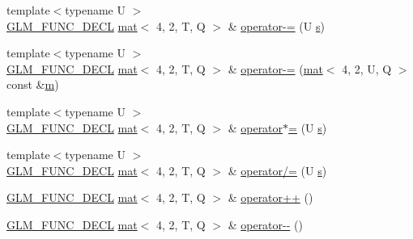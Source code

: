 \begin{DoxyCompactItemize}
\item 
{\footnotesize template$<$typename U $>$ }\\\hyperlink{setup_8hpp_ab2d052de21a70539923e9bcbf6e83a51}{G\+L\+M\+\_\+\+F\+U\+N\+C\+\_\+\+D\+E\+CL} \hyperlink{structglm_1_1mat}{mat}$<$ 4, 2, T, Q $>$ \& \hyperlink{structglm_1_1mat_3_014_00_012_00_01_t_00_01_q_01_4_a2154501995309db9c93fb4972f39f17c}{operator-\/=} (U \hyperlink{_s_d_l__opengl_8h_a4af680a6c683f88ed67b76f207f2e6e4}{s})
\item 
{\footnotesize template$<$typename U $>$ }\\\hyperlink{setup_8hpp_ab2d052de21a70539923e9bcbf6e83a51}{G\+L\+M\+\_\+\+F\+U\+N\+C\+\_\+\+D\+E\+CL} \hyperlink{structglm_1_1mat}{mat}$<$ 4, 2, T, Q $>$ \& \hyperlink{structglm_1_1mat_3_014_00_012_00_01_t_00_01_q_01_4_a965c05f65e92e3c87e4a1e36f80c1d82}{operator-\/=} (\hyperlink{structglm_1_1mat}{mat}$<$ 4, 2, U, Q $>$ const \&\hyperlink{_s_d_l__opengl__glext_8h_af593500c283bf1a787a6f947f503a5c2}{m})
\item 
{\footnotesize template$<$typename U $>$ }\\\hyperlink{setup_8hpp_ab2d052de21a70539923e9bcbf6e83a51}{G\+L\+M\+\_\+\+F\+U\+N\+C\+\_\+\+D\+E\+CL} \hyperlink{structglm_1_1mat}{mat}$<$ 4, 2, T, Q $>$ \& \hyperlink{structglm_1_1mat_3_014_00_012_00_01_t_00_01_q_01_4_a4e8ca47ff05d03dd3ed84685dc401376}{operator$\ast$=} (U \hyperlink{_s_d_l__opengl_8h_a4af680a6c683f88ed67b76f207f2e6e4}{s})
\item 
{\footnotesize template$<$typename U $>$ }\\\hyperlink{setup_8hpp_ab2d052de21a70539923e9bcbf6e83a51}{G\+L\+M\+\_\+\+F\+U\+N\+C\+\_\+\+D\+E\+CL} \hyperlink{structglm_1_1mat}{mat}$<$ 4, 2, T, Q $>$ \& \hyperlink{structglm_1_1mat_3_014_00_012_00_01_t_00_01_q_01_4_aa1a9ec4ecebe060e0d61b07cbde4c234}{operator/=} (U \hyperlink{_s_d_l__opengl_8h_a4af680a6c683f88ed67b76f207f2e6e4}{s})
\item 
\hyperlink{setup_8hpp_ab2d052de21a70539923e9bcbf6e83a51}{G\+L\+M\+\_\+\+F\+U\+N\+C\+\_\+\+D\+E\+CL} \hyperlink{structglm_1_1mat}{mat}$<$ 4, 2, T, Q $>$ \& \hyperlink{structglm_1_1mat_3_014_00_012_00_01_t_00_01_q_01_4_a973f220e1471a6dd869ce2b5eb569bfa}{operator++} ()
\item 
\hyperlink{setup_8hpp_ab2d052de21a70539923e9bcbf6e83a51}{G\+L\+M\+\_\+\+F\+U\+N\+C\+\_\+\+D\+E\+CL} \hyperlink{structglm_1_1mat}{mat}$<$ 4, 2, T, Q $>$ \& \hyperlink{structglm_1_1mat_3_014_00_012_00_01_t_00_01_q_01_4_adffff37695848dddf217654fbbd42862}{operator-\/-\/} ()
\item 

\end{DoxyCompactItemize}
